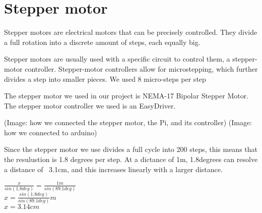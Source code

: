 \clearpage
\section{Stepper motor}
Stepper motors are electrical motors that can be precisely controlled. They divide a full rotation into a discrete amount of steps, each equally big.

Stepper motors are usually used with a specific circuit to control them, a stepper-motor controller. Stepper-motor controllers allow for microstepping, which further divides a step into smaller pieces. We used 8 micro-steps per step

The stepper motor we used in our project is NEMA-17 Bipolar Stepper Motor. \cite{steppermotor}
The stepper motor controller we used is an EasyDriver.\cite{steppercontroller}

(Image: how we connected the stepper motor, the Pi, and its controller)
(Image: how we connected to arduino)

%

Since the stepper motor we use divides a full cycle into 200 steps, this means that the resulustion is 1.8 degrees per step. At a dictance of 1m, 1.8degrees can resolve a distance of ~3.1cm, and this increases linearly with a larger distance.

$\frac{x}{sin(1.8deg)} = \frac{1m}{sin(89.1deg)}$ \\
$x = \frac{sin(1.8deg)}{sin(89.1deg)}m$ \\
$x = 3.14cm$ \\



